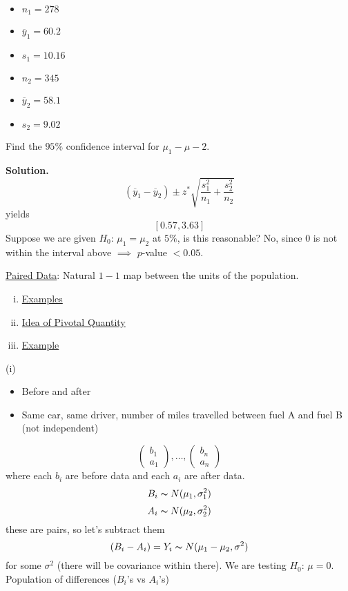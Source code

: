 \begin{exbox}
    \begin{example}\;
        \begin{itemize}
            \item $ n_1=278 $
            \item $ \overline{y}_1=60.2 $
            \item $ s_1=10.16 $
            \item $ n_2=345 $
            \item $ \overline{y}_2=58.1 $
            \item $ s_2=9.02 $
        \end{itemize}
        Find the $ 95\% $ confidence interval for $ \mu_1-\mu-2 $.

        \textbf{Solution.}
        \[ (\overline{y}_1-\overline{y}_2)\pm z^*\sqrt{\frac{s_1^2}{n_1}+\frac{s_2^2}{n_2}} \]
        yields
        \[ \left[ 0.57,3.63 \right] \]
        Suppose we are given $ H_0 $: $ \mu_1=\mu_2 $ at $ 5\% $, is this reasonable? No,
        since $ 0 $ is not within the interval above $ \implies $ $ p $-value $ <0.05 $.
    \end{example}
\end{exbox}

\underline{Paired Data}: Natural $ 1-1 $ map between the units of the population.
\begin{enumerate}[(i)]
    \item \underline{Examples}
    \item \underline{Idea of Pivotal Quantity}
    \item \underline{Example}
\end{enumerate}
(i)
\begin{itemize}
    \item Before and after
    \item Same car, same driver, number of miles travelled between fuel A and fuel B (not independent)
\end{itemize}
\[ \begin{pmatrix}
        b_1 \\
        a_1
    \end{pmatrix},\ldots,
    \begin{pmatrix}
        b_n \\
        a_n
    \end{pmatrix} \]
where each $ b_i $ are before data and each $ a_i $ are after data.
\[ B_i \thicksim N(\mu_1,\sigma_1^2) \]
\[ A_i \thicksim N(\mu_2,\sigma_2^2) \]
these are pairs, so let's subtract them
\[ (B_i-A_i)=Y_i \thicksim N(\mu_1-\mu_2,\sigma^2) \]
for some $ \sigma^2 $ (there will be covariance within there).
We are testing $ H_0 $: $ \mu=0 $. Population of differences ($ B_i $'s vs $ A_i $'s)


